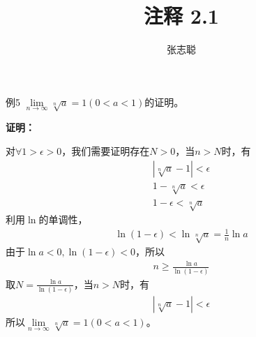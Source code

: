 \documentclass{article}
\begin{document}
\title{注释 2.1}
\author{张志聪}
\maketitle

\begin{zremark}
  例5 $\lim\limits_{n \to \infty} \sqrt[n]{a} = 1 (0 < a < 1)$的证明。
\end{zremark}

\textbf{证明：}

对$\forall 1 > \epsilon > 0$，我们需要证明存在$N > 0$，当$n > N$时，有
\begin{align*}
  |\sqrt[n]{a} - 1| < \epsilon \\
  1 - \sqrt[n]{a} < \epsilon \\
  1 - \epsilon < \sqrt[n]{a}
\end{align*}
利用$\ln$的单调性，
\begin{align*}
  \ln (1 - \epsilon) < \ln \sqrt[n]{a} = \frac{1}{n} \ln a 
\end{align*}
由于$\ln a < 0, \ln (1 - \epsilon) < 0$，所以
\begin{align*}
  n \geq \frac{\ln a}{\ln (1 - \epsilon)}
\end{align*}
取$N = \frac{\ln a}{\ln (1 - \epsilon)}$，当$n > N$时，有
\begin{align*}
  |\sqrt[n]{a} - 1| < \epsilon
\end{align*}
所以$\lim\limits_{n \to \infty} \sqrt[n]{a} = 1 (0 < a < 1)$。
\end{document}
